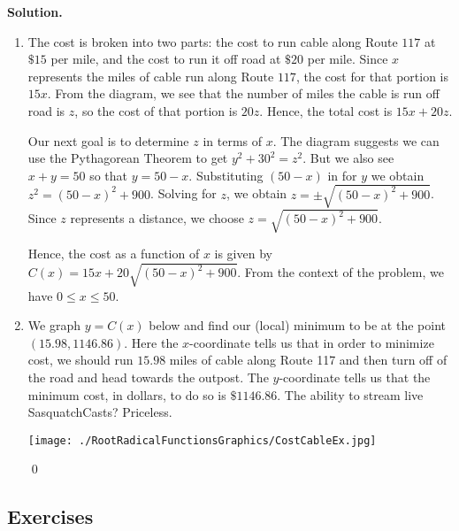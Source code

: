 \documentclass{ximera}
\begin{document}
\begin{example}
{\bf Solution.}

\begin{enumerate}

\item  The cost is broken into two parts:  the cost to run cable along Route $117$ at $\$15$ per mile, and the cost to run it off road at $\$20$ per mile.  Since $x$ represents the miles of cable run along Route $117$, the cost  for that portion is $15x$.  
From the diagram, we see that the number of miles the cable is run off road is $z$, so the cost of that portion is $20z$.  Hence, the total cost is $15x + 20z$.  

\smallskip

Our next goal is to determine $z$ in terms of $x$.  The diagram suggests we can use the Pythagorean Theorem to get $y^2+30^2 = z^2$.  But we also see $x+y = 50$ so that $y=50-x$.  Substituting $(50-x)$ in for $y$ we obtain $z^2 = (50-x)^2+900$.  Solving for $z$, we obtain $z = \pm \sqrt{(50-x)^2+900}$.  Since $z$ represents a distance, we choose $z = \sqrt{(50-x)^2+900}$.

Hence, the cost as a function of $x$  is given by $C(x) = 15x + 20\sqrt{(50-x)^2+900}$.  From the context of the problem, we have $0 \leq x \leq 50$.

\item  We graph $y=C(x)$ below and find our (local) minimum to be at the point $(15.98, 1146.86)$.  Here the $x$-coordinate tells us that in order to minimize cost, we should run $15.98$ miles of cable along Route 117 and then turn off of the road and head towards the outpost. The $y$-coordinate tells us that the minimum cost, in dollars, to do so is $\$1146.86$.  The ability to stream live SasquatchCasts?  Priceless.

\medskip

\centerline{\texttt{[image: ./RootRadicalFunctionsGraphics/CostCableEx.jpg]}}


 \qed

\end{enumerate}

\end{example}

\newpage

\subsection{Exercises}


\closegraphsfile
\end{document}
